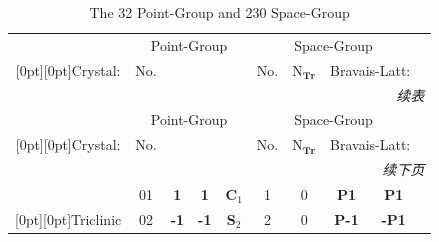 \documentclass{article}      %
\begin{document}
\begin{small}
\begin{longtable}[c]{|c|c|c|c|c|c|c|c|c|}
	\caption{\textrm{The 32 Point-Group and 230 Space-Group}}
\label{tab:Space-Group}\\ %
\hline
%
&\multicolumn{4}{c|}{\textrm{Point-Group}}  &\multicolumn{4}{c|}{\textrm{Space-Group}} \\ \cline{2-9}
\raisebox{2.3ex}[0pt][0pt]{\textrm{Crystal}:} &\textrm{No.}  & \multicolumn{2}{c}{} & &\textrm{No.} &$\mathrm{N}_{\mathbf{Tr}}$ & \multicolumn{2}{c|}{\textrm{Bravais-Latt}:}\\ \hline
\endfirsthead
%
\multicolumn{10}{r}{\it 续表}\\
\hline
&\multicolumn{4}{c|}{\textrm{Point-Group}}  &\multicolumn{4}{c|}{\textrm{Space-Group}} \\ \cline{2-9}
\raisebox{2.3ex}[0pt][0pt]{\textrm{Crystal}:} &\textrm{No.}  &\multicolumn{2}{c}{} & &\textrm{No.} &$\mathrm{N}_{\mathbf{Tr}}$ & \multicolumn{2}{c|}{\textrm{Bravais-Latt}:}\\ \hline
\endhead
%
\multicolumn{10}{r}{\it 续下页}\\
\endfoot
\hline
%
\endlastfoot
%
%
& \textrm{01} &\textbf{1} &\textbf{1} &$\mathbf{C}_1$ &\textrm{1} &0 &\textbf{P1}&\textbf{P1} \\\cline{2-9}
\raisebox{2.3ex}[0pt][0pt]{\textrm{Triclinic}} & \textrm{02} &\textbf{-1} &\textbf{-1} &$\mathbf{S}_2$ &\textrm{2} &0 &\textbf{P-1}&\textbf{-P1} \\\hline

\end{longtable}
\end{small}
\end{document}
